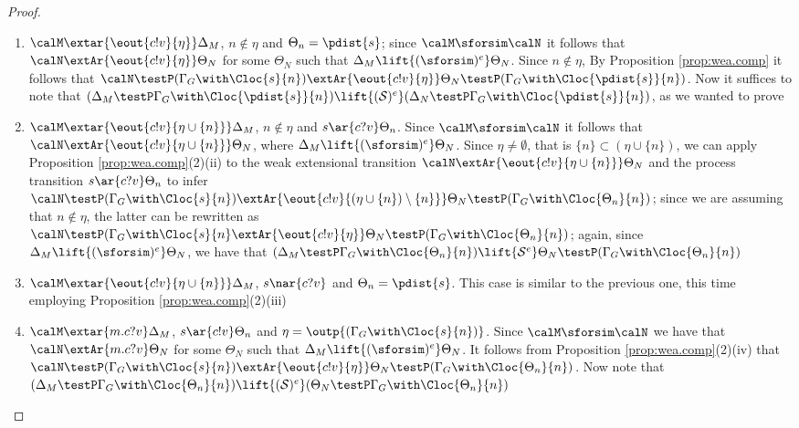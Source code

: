 \documentclass{LMCS}
\begin{document}
\begin{proof}
\begin{enumerate}[label=(\roman*)]
\item $\calM \extar{\eout{c!v}{\eta}} \Delta_M$, $n \notin \eta$ and 
$\Theta_n = \pdist{s}$; 
since $\calM \sforsim \calN$ it follows that 
$\calN \extAr{\eout{c!v}{\eta}} \Theta_N$ for 
some $\Theta_N$ such that  
$\Delta_M \lift{(\sforsim)^e} \Theta_N$. Since 
$n \notin \eta$, By Proposition 
\ref{prop:wea.comp} it follows that $\calN \testP 
(\Gamma_G \with \Cloc{s}{n}) \extAr{\eout{c!v}{\eta}} 
\Theta_N \testP (\Gamma_G \with \Cloc{\pdist{s}}{n})$. 
Now it suffices to note that 
$(\Delta_M \testP \Gamma_G \with \Cloc{\pdist{s}}{n}) \lift{({\mathcal S})^e} 
(\Delta_N \testP \Gamma_G \with \Cloc{\pdist{s}}{n})$, 
as we wanted to prove
\item $\calM \extar{\eout{c!v}{\eta \cup \{n\}}} \Delta_M$, 
$n \notin \eta$ and $s \ar{c?v} \Theta_n$.  
Since $\calM \sforsim \calN$ it follows that 
$\calN \extAr{\eout{c!v}{\eta \cup \{n\}}} \Theta_N$, 
where $\Delta_M \lift{(\sforsim)^e} \Theta_N$. 
Since $\eta \neq \emptyset$, that is  
$\{n\} \subset (\eta \cup \{n\})$, we can apply Proposition \ref{prop:wea.comp}(2)(ii)
to the weak extensional transition $\calN \extAr{\eout{c!v}{\eta \cup \{n\}}} 
\Theta_N$ and the process transition $s \ar{c?v} \Theta_n$ 
to infer $\calN \testP (\Gamma_G \with \Cloc{s}{n}) 
\extAr{\eout{c!v}{(\eta \cup \{n\}) \setminus \{n\}}} 
\Theta_N \testP (\Gamma_G \with \Cloc{\Theta_n}{n})$; since 
we are assuming that $n \notin \eta$, the 
latter can be rewritten as  $\calN \testP (\Gamma_G \with \Cloc{s}{n} 
\extAr{\eout{c!v}{\eta}} 
\Theta_N \testP (\Gamma_G \with \Cloc{\Theta_n}{n})$; 
again, since $\Delta_M \lift{(\sforsim)^e} \Theta_N$, we have that 
$(\Delta_M \testP \Gamma_G \with \Cloc{\Theta_n}{n}) 
\lift{{\mathcal S}^e} \Theta_N \testP (\Gamma_G \with \Cloc{\Theta_n}{n})$

\item $\calM \extar{\eout{c!v}{\eta \cup \{n\}}} \Delta_M$, 
$s \nar{c?v}$ and $\Theta_n = \pdist{s}$. This case is 
similar to the previous one, this time employing Proposition 
\ref{prop:wea.comp}(2)(iii)

\item $\calM \extar{m.c?v} \Delta_M$, $s \ar{c!v} \Theta_n$ and 
$\eta = \outp{(\Gamma_G \with \Cloc{s}{n})}$. 
Since $\calM \sforsim \calN$ we have that 
$\calN \extAr{m.c?v} \Theta_N$ for some $\Theta_N$ 
such that $\Delta_M \lift{(\sforsim)^e} \Theta_N$. 
It follows from Proposition \ref{prop:wea.comp}(2)(iv) 
that $\calN \testP (\Gamma_G \with \Cloc{s}{n}) 
\extAr{\eout{c!v}{\eta}} \Theta_N \testP (\Gamma_G \with \Cloc{\Theta_n}{n})$. 
Now note that $(\Delta_M \testP \Gamma_G \with \Cloc{\Theta_n}{n}) \lift{(\mathcal S)^e} 
(\Theta_N \testP \Gamma_G \with \Cloc{\Theta_n}{n})$


\end{enumerate}
\end{proof}
\end{document}

